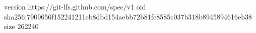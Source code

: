 version https://git-lfs.github.com/spec/v1
oid sha256:7909656f152241211cb8dbd154aebb72b81fc8585c037b318b8945894616eb38
size 262240
